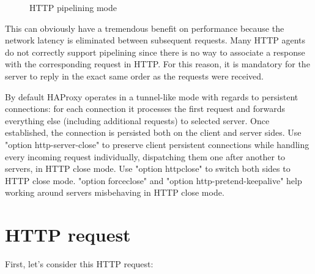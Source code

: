 \begin{figure}[!ht]
\centering
{}

\caption{HTTP pipelining mode}
\label{fig:http_pipelining}
\end{figure}

This can obviously have a tremendous benefit on performance because the network
latency is eliminated between subsequent requests. Many HTTP agents do not
correctly support pipelining since there is no way to associate a response with
the corresponding request in HTTP. For this reason, it is mandatory for the
server to reply in the exact same order as the requests were received.

By default HAProxy operates in a tunnel-like mode with regards to persistent
connections: for each connection it processes the first request and forwards
everything else (including additional requests) to selected server. Once
established, the connection is persisted both on the client and server
sides. Use "option http-server-close" to preserve client persistent connections
while handling every incoming request individually, dispatching them one after
another to servers, in HTTP close mode. Use "option httpclose" to switch both
sides to HTTP close mode. "option forceclose" and "option
http-pretend-keepalive" help working around servers misbehaving in HTTP close
mode.


\section{HTTP request}

First, let's consider this HTTP request:

